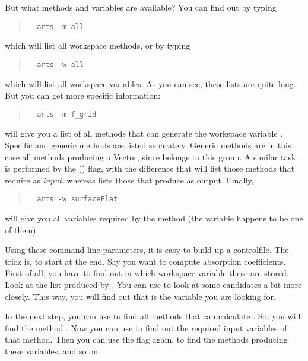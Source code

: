 But what methods and variables are available? You can find out by
typing
\begin{quote}
\begin{verbatim}
  arts -m all
\end{verbatim}
\end{quote}
which will list all workspace methods, or by typing 
\begin{quote}
\begin{verbatim}
  arts -w all
\end{verbatim}
\end{quote}
which will list all workspace variables. As you can see, these lists
are quite long. But you can get more specific information:
\begin{quote}
\begin{verbatim}
  arts -m f_grid
\end{verbatim}
\end{quote}
will give you a list of all methods that can generate the workspace
variable . Specific and generic methods are listed
separately. Generic methods are in this case all methods producing a
Vector, since  belongs to this group. A similar task is
performed by the  () flag, with the difference
that  will list those methods that require
 as \emph{input}, whereas  lists
those that produce  as output. Finally,
\begin{quote}
\begin{verbatim}
  arts -w surfaceFlat
\end{verbatim}
\end{quote}
will give you all variables required by the method 
(the variable  happens to be one of them).

Using these command line parameters, it is easy to build up a
controlfile. The trick is, to start at the end. Say you want to
compute absorption coefficients. First of all, you have to find out
in which workspace variable these are stored. Look at the list
produced by . You can use  to look at
some candidates a bit more closely. This way, you will find out that
 is the variable you are looking for.

In the next step, you can use  to find all methods
that can calculate . So, you will find the method
. Now you can use  to find out the
required input variables of that method. Then you can use the
 flag again, to find the methods producing these variables,
and so on.


